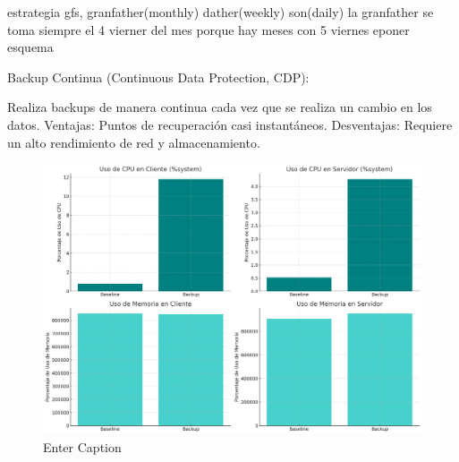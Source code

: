 estrategia gfs, granfather(monthly) dather(weekly) son(daily)
la granfather se toma siempre el 4 vierner del mes porque hay meses con 5 viernes
eponer esquema




Backup Continua (Continuous Data Protection, CDP):

Realiza backups de manera continua cada vez que se realiza un cambio en los datos.
Ventajas: Puntos de recuperación casi instantáneos.
Desventajas: Requiere un alto rendimiento de red y almacenamiento.




\begin{figure}
    \centering
    \includegraphics[width=0.5\linewidth]{uso_de_recursos.png}
    \caption{Enter Caption}
    \label{fig:enter-label}
\end{figure}